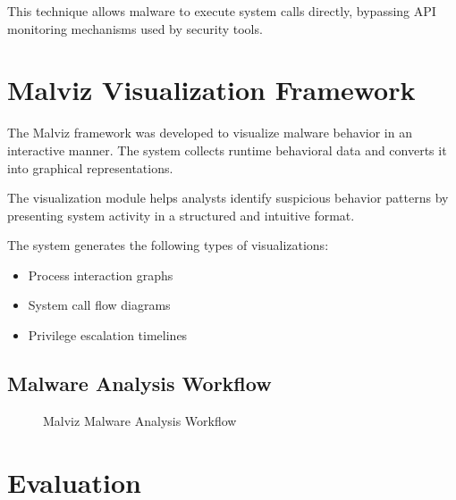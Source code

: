 This technique allows malware to execute system calls directly, bypassing API monitoring 
mechanisms used by security tools.

\section{Malviz Visualization Framework}

The Malviz framework was developed to visualize malware behavior in an interactive manner. 
The system collects runtime behavioral data and converts it into graphical representations.

The visualization module helps analysts identify suspicious behavior patterns by presenting 
system activity in a structured and intuitive format.

The system generates the following types of visualizations:

\begin{itemize}
\item Process interaction graphs
\item System call flow diagrams
\item Privilege escalation timelines
\end{itemize}

\subsection{Malware Analysis Workflow}

\begin{figure}[H]
\centering
{}
\caption{Malviz Malware Analysis Workflow}
\end{figure}

\section{Evaluation}

